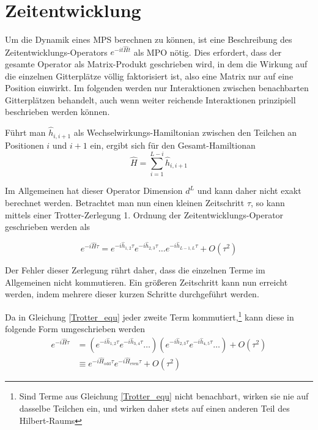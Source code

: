 \documentclass[10pt,a4paper]{report}
\begin{document}
\section{Zeitentwicklung}\label{tMPS}

Um die Dynamik eines MPS berechnen zu können, ist eine Beschreibung des Zeitentwicklungs-Operators $e^{-it\hat{H}t}$ als MPO nötig. Dies erfordert, dass der gesamte Operator als Matrix-Produkt geschrieben wird, in dem die Wirkung auf die einzelnen Gitterplätze völlig faktorisiert ist, also eine Matrix nur auf eine Position einwirkt. Im folgenden werden nur Interaktionen zwischen benachbarten Gitterplätzen behandelt, auch wenn weiter reichende Interaktionen prinzipiell beschrieben werden können.

Führt man $\hat{h}_{i,i+1}$ als Wechselwirkungs-Hamiltonian zwischen den Teilchen an Positionen $i$ und $i+1$ ein, ergibt sich für den Gesamt-Hamiltionan
\begin{equation}
\hat{H}=\sum_{i=1}^{L-i}\hat{h}_{i,i+1}
\end{equation}

Im Allgemeinen hat dieser Operator Dimension $d^L$ und kann daher nicht exakt berechnet werden. Betrachtet man nun einen kleinen Zeitschritt $\tau$, so kann mittels einer Trotter-Zerlegung 1. Ordnung der Zeitentwicklungs-Operator geschrieben werden als

\begin{equation}\label{Trotter_equ}
e^{-i\hat{H}\tau}= e^{-i\hat{h}_{1,2}\tau}e^{-i\hat{h}_{2,3}\tau}\ldots e^{-i\hat{h}_{L-1,L}\tau}+O(\tau^2)
\end{equation}

Der Fehler dieser Zerlegung rührt daher, dass die einzelnen Terme im Allgemeinen nicht kommutieren. Ein größeren Zeitschritt kann nun erreicht werden, indem mehrere dieser kurzen Schritte durchgeführt werden.

Da in Gleichung \ref{Trotter_equ} jeder zweite Term kommutiert,\footnote{Sind Terme aus Gleichung \ref{Trotter_equ} nicht benachbart, wirken sie nie auf dasselbe Teilchen ein, und wirken daher stets auf einen anderen Teil des Hilbert-Raums} kann diese in folgende Form umgeschrieben werden
\begin{equation}
\begin{split}
e^{-i\hat{H}\tau}&=(e^{-i\hat{h}_{1,2}\tau}e^{-i\hat{h}_{3,4}\tau}\ldots)(e^{-i\hat{h}_{2,3}\tau}e^{-i\hat{h}_{4,5}\tau}\ldots)+O(\tau^2)\\
&\equiv e^{-i\hat{H}_{\text{odd}}\tau}e^{-i\hat{H}_{\text{even}}\tau}+O(\tau^2)
\end{split}
\end{equation}
\end{document}
